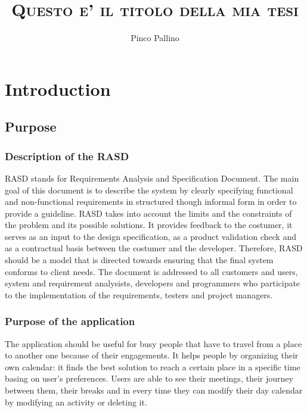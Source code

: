 \documentclass[12pt,titlepage]{article}
\title{\textsc{Questo e' il titolo della mia tesi}}
\author{Pinco Pallino}
\begin{document}


\maketitle

\tableofcontents

\pagebreak

\section{Introduction} \label{introduzione}

\subsection{Purpose} \label{sec:purpose}

\medskip
\subsubsection{Description of the RASD}\label{RASD}
RASD stands for Requirements Analysis and Specification Document.
The main goal of this document is to describe the system by clearly specifying functional and non-functional requirements in structured though informal form in order to provide a guideline.
RASD takes into account the limits and the constraints of the problem and its possible solutions. 
It provides feedback to the costumer, it serves as an input to the design specification, as a product validation check and as a contractual basis between the costumer and the developer.
Therefore, RASD should be a model that is directed towards ensuring that the final system conforms to client needs.
The document is addressed to all customers and users, system and requirement analysists, developers and programmers who participate to the implementation of the requirements, testers and project managers.

\subsubsection{Purpose of the application}\label{RASD}
The application should be useful for busy people that have to travel from a place to another one because of their engagements. It helps people by organizing their own calendar: it finds the best solution to reach a certain place in a specific time basing on user's preferences. 
Users are able to see their meetings, their journey between them, their breaks and in every time they can modify their day calendar by modifying an activity or deleting it.
\end{document}
